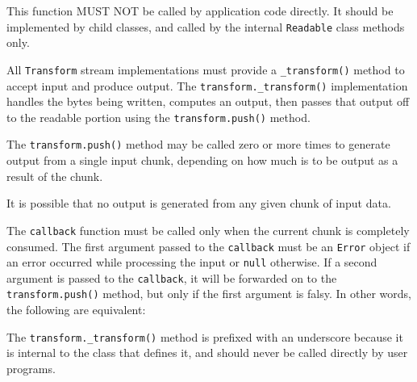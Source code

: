 This function MUST NOT be called by application code directly. It should
be implemented by child classes, and called by the internal
\texttt{Readable} class methods only.

All \texttt{Transform} stream implementations must provide a
\texttt{\_transform()} method to accept input and produce output. The
\texttt{transform.\_transform()} implementation handles the bytes being
written, computes an output, then passes that output off to the readable
portion using the \texttt{transform.push()} method.

The \texttt{transform.push()} method may be called zero or more times to
generate output from a single input chunk, depending on how much is to
be output as a result of the chunk.

It is possible that no output is generated from any given chunk of input
data.

The \texttt{callback} function must be called only when the current
chunk is completely consumed. The first argument passed to the
\texttt{callback} must be an \texttt{Error} object if an error occurred
while processing the input or \texttt{null} otherwise. If a second
argument is passed to the \texttt{callback}, it will be forwarded on to
the \texttt{transform.push()} method, but only if the first argument is
falsy. In other words, the following are equivalent:

\begin{Shaded}
\begin{Highlighting}[]
 \OperatorTok{=} \OperatorTok{,}\OperatorTok{,}
  \OperatorTok{;}
  \NormalTok{()}\OperatorTok{;}
\NormalTok{\}}\OperatorTok{;}

 \OperatorTok{=} \OperatorTok{,}\OperatorTok{,}
  \NormalTok{(}\OperatorTok{,}\OperatorTok{;}
\NormalTok{\}}\OperatorTok{;}
\end{Highlighting}
\end{Shaded}

The \texttt{transform.\_transform()} method is prefixed with an
underscore because it is internal to the class that defines it, and
should never be called directly by user programs.

